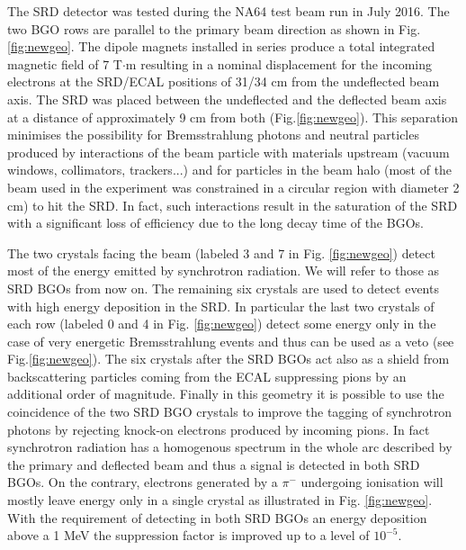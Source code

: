 The SRD detector was tested during the NA64 test beam run in July 2016. The two BGO rows are parallel to the primary beam direction as shown in Fig.\ref{fig:newgeo}. The dipole magnets installed in series produce a total integrated magnetic field of 7 T$\cdot$m \cite{Banerjee:2016tad} resulting in a nominal displacement for the incoming electrons at the SRD/ECAL positions of 31/34 cm from the undeflected beam axis. The SRD was placed between the undeflected and the deflected beam axis at a distance of approximately 9 cm from both (Fig.\ref{fig:newgeo}). This separation minimises the possibility for Bremsstrahlung photons and neutral particles produced by interactions of the beam particle with materials upstream (vacuum windows, collimators, trackers...) and for particles in the beam halo (most of the beam used in the experiment was constrained in a circular region with diameter 2 cm) to hit the SRD. In fact, such interactions result in the saturation of the SRD with a significant loss of efficiency due to the long decay time of the BGOs.


The two crystals facing the beam (labeled 3 and 7 in Fig. \ref{fig:newgeo}) detect most of the energy emitted by synchrotron radiation. We will refer to those as SRD BGOs from now on. The remaining six crystals are used to detect events with high energy deposition in the SRD. In particular the last two crystals of each row (labeled 0 and 4 in Fig. \ref{fig:newgeo}) detect some energy only in the case of very energetic Bremsstrahlung events and thus can be used as a veto (see Fig.\ref{fig:newgeo}). The six crystals after the SRD BGOs act also as a shield from backscattering particles coming from the ECAL suppressing pions by an additional order of magnitude. Finally in this geometry it is possible to use the coincidence of the two SRD BGO crystals to improve the tagging of synchrotron photons by rejecting knock-on electrons produced by incoming pions. In fact synchrotron radiation has a homogenous spectrum in the whole arc described by the primary and deflected beam and thus a signal is detected in both SRD BGOs. On the contrary, electrons generated by a $\pi^-$ undergoing ionisation will mostly leave energy only in a single crystal as illustrated in Fig. \ref{fig:newgeo}. 
With the requirement of detecting in both SRD BGOs an energy deposition above a 1 MeV the suppression factor is improved up to a level of $10^{-5}$.



